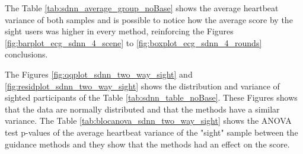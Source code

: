 The Table \ref{tab:sdnn_average_group_noBase} shows the average heartbeat variance of both samples and is possible to notice how the average score by the sight users was higher in every method, reinforcing the Figures \ref{fig:barplot_ecg_sdnn_4_scene} to \ref{fig:boxplot_ecg_sdnn_4_rounds} conclusions.



The Figures \ref{fig:qqplot_sdnn_two_way_sight} and \ref{fig:residplot_sdnn_two_way_sight} shows the distribution and variance of sighted participants of the Table \ref{tab:sdnn_table_noBase}. These Figures shows that the data are normally distributed and that the methods have a similar variance.
The Table \ref{tab:blocanova_sdnn_two_way_sight} shows the ANOVA test p-values of the average heartbeat variance of the "sight" sample between the guidance methods and they show that the methods had an effect on the score.



